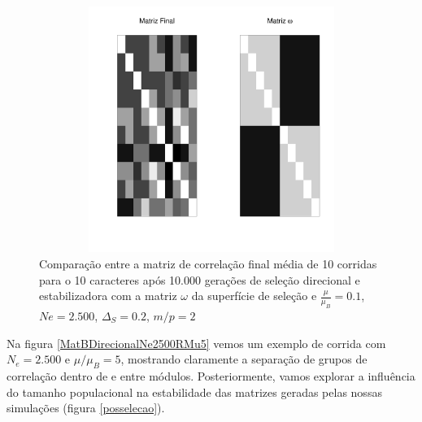 \begin{figure}[htbp]
   \centering
   \includegraphics[width=150mm, height=80mm]{figuras/RMu01Omega}
   \caption{Comparação entre a matriz de correlação final média de 10
      corridas para o 10 caracteres após 10.000 gerações de seleção direcional e
      estabilizadora com a matriz $\omega$ da superfície de seleção e
   $\frac{\mu}{\mu_B}=0.1$, $Ne=2.500$, $\Delta_S=0.2$, $m/p=2$}
   \label{RMu01}
\end{figure}


Na figura \ref{MatBDirecionalNe2500RMu5} vemos um exemplo de corrida com
$N_e = 2.500$ e $\mu/\mu_B=5$, mostrando claramente a separação de grupos
de correlação dentro de e entre módulos. 
Posteriormente, vamos explorar a influência do tamanho populacional na
estabilidade das matrizes geradas pelas nossas simulações (figura
\ref{posselecao}). 


